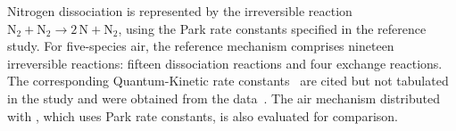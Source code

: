 Nitrogen dissociation is represented by the irreversible reaction
$\mathrm{N_2 + N_2 \rightarrow 2\,N + N_2}$, using the Park rate constants
specified in the reference study. For five-species air, the reference
mechanism comprises nineteen irreversible reactions: fifteen dissociation
reactions and four exchange reactions. The corresponding Quantum-Kinetic
rate constants~\cite{scanlon2015} are cited but not tabulated in the study
and were obtained from the \hyfoam{} data~\cite{hystrath}. The air mechanism
distributed with \mpp{}, which uses Park rate constants, is also evaluated
for comparison.
